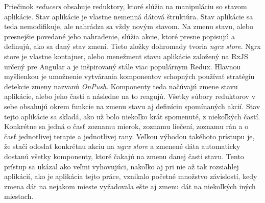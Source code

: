 Priečinok \textit{reducers} obsahuje reduktory, ktoré slúžia na manipuláciu so stavom aplikácie. Stav aplikácie je vlastne nemenná dátová štruktúra. Stav aplikácie sa teda nemodifikuje, ale nahrádza sa vždy novým stavom. Na zmenu stavu, alebo presnejšie povedané jeho nahradenie, slúžia akcie, ktoré presne popisujú a definujú, ako sa daný stav zmení. Tieto zložky dohromady tvoria \textit{ngrx store}. Ngrx store je vlastne kontajner, alebo menežment stavu aplikácie založený na RxJS určený pre Angular a je inšpirovaný stále viac populárnym Redux. Hlavnou myšlienkou je umožnenie vytvárania komponentov schopných používať stratégiu detekcie zmeny nazvanú \textit{OnPush}.\cite{nic5zZJbUwJyjA3R} Komponenty teda načúvajú zmene stavu aplikácie, alebo jeho časti a následne na to reagujú. Všetky súbory reduktorov v sebe obsahujú okrem funkcie na zmenu stavu aj definíciu spomínaných akcií. Stav tejto aplikácie sa skladá, ako už bolo niekoľko krát spomenuté, z niekoľkých častí. Konkrétne sa jedná o časť zoznamu mierok, zoznamu liečení, zoznamu rán a o časť jednotlivej terapie a jednotlivej rany. Veľkou výhodou takéhoto prístupu je, že stačí odoslať konkrétnu akciu na \textit{ngrx store} a zmenené dáta automaticky dostanú všetky komponenty, ktoré čakajú na zmenu danej časti stavu. Tento prístup sa ukázal ako veľmi vyhovujúci, nakoľko aj pri nie až tak rozsiahlej aplikácií, ako je aplikácia tejto práce, vznikalo početné množstvo závislostí, kedy zmena dát na nejakom mieste  vyžadovala ešte aj zmenu dát na niekoľkých iných miestach.

